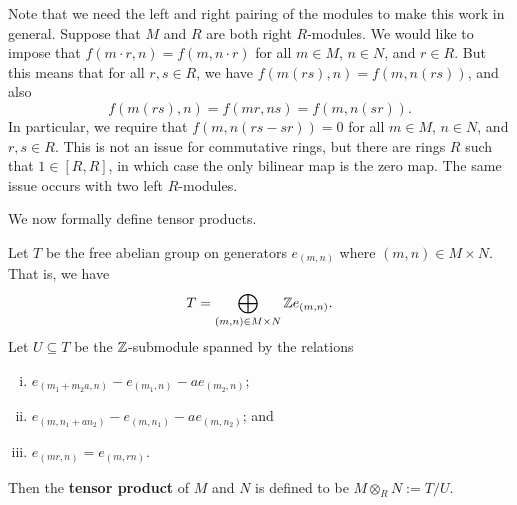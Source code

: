 \begin{remark}{}
    Note that we need the left and right pairing of the modules to make this work 
    in general. Suppose that $M$ and $R$ are both right $R$-modules. We would like 
    to impose that $f(m \cdot r, n) = f(m, n \cdot r)$ for all $m \in M$, $n \in N$, and 
    $r \in R$. But this means that for all $r, s \in R$, we have $f(m(rs), n) 
    = f(m, n(rs))$, and also 
    \[ f(m(rs), n) = f(mr, ns) = f(m, n(sr)). \] 
    In particular, we require that $f(m, n(rs - sr)) = 0$ for all $m \in M$, 
    $n \in N$, and $r, s \in R$. This is not an issue for commutative rings, 
    but there are rings $R$ such that $1 \in [R, R]$, in which case the only 
    bilinear map is the zero map. The same issue occurs with two left $R$-modules. 
\end{remark}

We now formally define tensor products. 

\begin{defn}{}
    Let $T$ be the free abelian group on generators $e_{(m,n)}$ where $(m, n) 
    \in M \times N$. That is, we have 
    \[ T = \bigoplus_{(m, n) \in M \times N} \mathbb{Z} e_{(m,n)}. \] 
    Let $U \subseteq T$ be the $\mathbb{Z}$-submodule spanned by the relations 
    \begin{enumerate}[(i)]
        \item $e_{(m_1 + m_2a, n)} - e_{(m_1, n)} - ae_{(m_2, n)}$; 
        \item $e_{(m, n_1 + an_2)} - e_{(m, n_1)} - ae_{(m, n_2)}$; and 
        \item $e_{(mr, n)} = e_{(m, rn)}$. 
    \end{enumerate}
    Then the {\bf tensor product} of $M$ and $N$ is defined to be 
    $M \otimes_R N := T/U$. 
\end{defn}